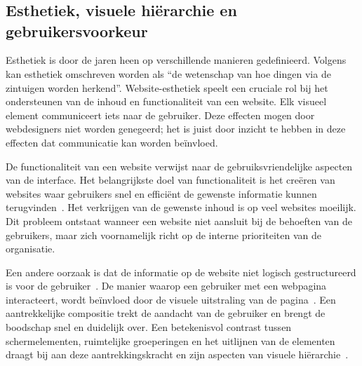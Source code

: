 \chapter{}%
\label{ch:stand-van-zaken}
\section [Esthetiek, hiërarchie en voorkeur]{Esthetiek, visuele hiërarchie en\\gebruikersvoorkeur}
Esthetiek is door de jaren heen op verschillende manieren gedefinieerd. Volgens \textcite[12]{Noponen2017} kan esthetiek omschreven worden als “de wetenschap van hoe dingen via de zintuigen worden herkend”. Website-esthetiek speelt een cruciale rol bij het ondersteunen van de inhoud en functionaliteit van een website. Elk visueel element communiceert iets naar de gebruiker. Deze effecten mogen door webdesigners niet worden genegeerd; het is juist door inzicht te hebben in deze effecten dat communicatie kan worden beïnvloed.\smallskip\par
De functionaliteit van een website verwijst naar de gebruiksvriendelijke aspecten van de interface. Het belangrijkste doel van functionaliteit is het creëren van websites waar gebruikers snel en efficiënt de gewenste informatie kunnen terugvinden~\autocite{Thorlacius2007}. Het verkrijgen van de gewenste inhoud is op veel websites moeilijk. Dit probleem ontstaat wanneer een website niet aansluit bij de behoeften van de gebruikers, maar zich voornamelijk richt op de interne prioriteiten van de organisatie.\par Een andere oorzaak is dat de informatie op de website niet logisch gestructureerd is voor de gebruiker~\autocite{Bevan1997}. De manier waarop een gebruiker met een webpagina interacteert, wordt beïnvloed door de visuele uitstraling van de pagina~\autocite{Michailidou2008}. Een aantrekkelijke compositie trekt de aandacht van de gebruiker en brengt de boodschap snel en duidelijk over. Een betekenisvol contrast tussen schermelementen, ruimtelijke groeperingen en het uitlijnen van de elementen draagt bij aan deze aantrekkingskracht en zijn aspecten van visuele hiërarchie~\autocite{Bhaskar2011}.\smallskip\par
